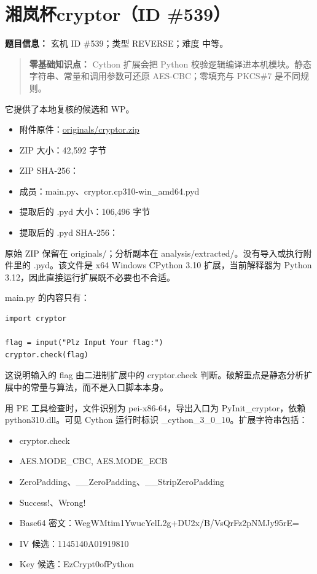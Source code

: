 \section{湘岚杯cryptor（ID \#539）}\label{ux6e58ux5c9aux676fcryptorid-539}

\textbf{题目信息：} 玄机 ID \#539；类型 REVERSE；难度 中等。

\begin{quote}
\textbf{零基础知识点：} Cython 扩展会把 Python 校验逻辑编译进本机模块。静态字符串、常量和调用参数可还原 AES-CBC；零填充与 PKCS\#7 是不同规则。
\end{quote}

它提供了本地复核的候选和 WP。

\begin{itemize}
\tightlist
\item
  附件原件：\href{../题目资料/题目分类/逆向工程/cryptor_539/originals/cryptor.zip}{originals/cryptor.zip}
\item
  ZIP 大小：42,592 字节
\item
  ZIP SHA-256：
\item
  成员：main.py、cryptor.cp310-win\_amd64.pyd
\item
  提取后的 .pyd 大小：106,496 字节
\item
  提取后的 .pyd SHA-256：
\end{itemize}

原始 ZIP 保留在 originals/；分析副本在 analysis/extracted/。没有导入或执行附件里的 .pyd。该文件是 x64 Windows CPython 3.10 扩展，当前解释器为 Python 3.12，因此直接运行扩展既不必要也不合适。

main.py 的内容只有：

\begin{verbatim}
import cryptor

flag = input("Plz Input Your flag:")
cryptor.check(flag)
\end{verbatim}

这说明输入的 flag 由二进制扩展中的 cryptor.check 判断。破解重点是静态分析扩展中的常量与算法，而不是入口脚本本身。

用 PE 工具检查时，文件识别为 pei-x86-64，导出入口为 PyInit\_cryptor，依赖 python310.dll。可见 Cython 运行时标识 \_cython\_3\_0\_10。扩展字符串包括：

\begin{itemize}
\tightlist
\item
  cryptor.check
\item
  AES.MODE\_CBC, AES.MODE\_ECB
\item
  ZeroPadding、\_\_ZeroPadding、\_\_StripZeroPadding
\item
  Success!、Wrong!
\item
  Base64 密文：WegWMtim1YwucYelL2g+DU2x/B/VsQrFz2pNMJy95rE=
\item
  IV 候选：1145140A01919810
\item
  Key 候选：EzCrypt0ofPython
\end{itemize}

